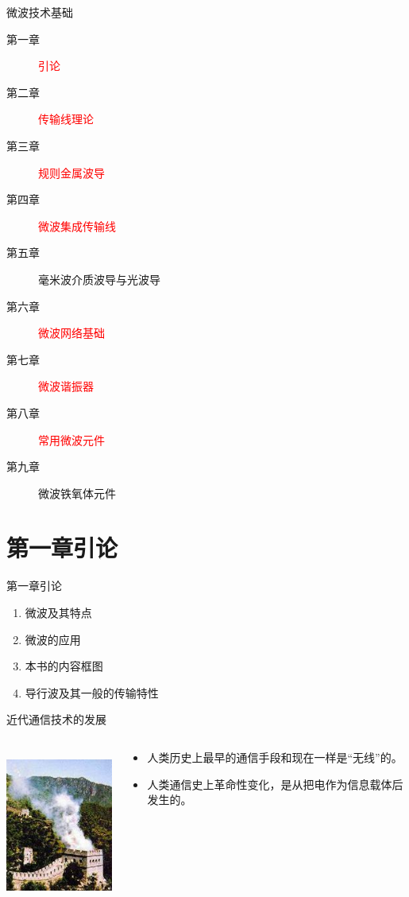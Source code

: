 \documentclass{ctexbeamer}
\begin{document}
\begin{frame}{微波技术基础}
  \begin{description}
    \item[第一章] \textcolor{red}{引论}
    \item[第二章] \textcolor{red}{传输线理论}
    \item[第三章] \textcolor{red}{规则金属波导}
    \item[第四章] \textcolor{red}{微波集成传输线}
    \item[第五章] 毫米波介质波导与光波导
    \item[第六章] \textcolor{red}{微波网络基础}
    \item[第七章] \textcolor{red}{微波谐振器}
    \item[第八章] \textcolor{red}{常用微波元件}
    \item[第九章] 微波铁氧体元件
  \end{description}
\end{frame}

\section{第一章\quad 引论}
\begin{frame}{第一章\quad 引论}
  \begin{enumerate}
    \item 微波及其特点
    \item 微波的应用
    \item 本书的内容框图
    \item 导行波及其一般的传输特性
  \end{enumerate}
\end{frame}

\begin{frame}{近代通信技术的发展}
  \begin{columns}
    \begin{column}{0.35\linewidth}
      \centering
      \includegraphics[height=5cm]{fenghuotai2.jpg}
    \end{column}
    \begin{column}{0.65\linewidth}
      \centering
      \begin{itemize}
        \item 人类历史上最早的通信手段和现在一样是“无线”的。
        \item 人类通信史上革命性变化，是从把电作为信息载体后发生的。
      \end{itemize}
    \end{column}
  \end{columns}
\end{frame}
\end{document}
